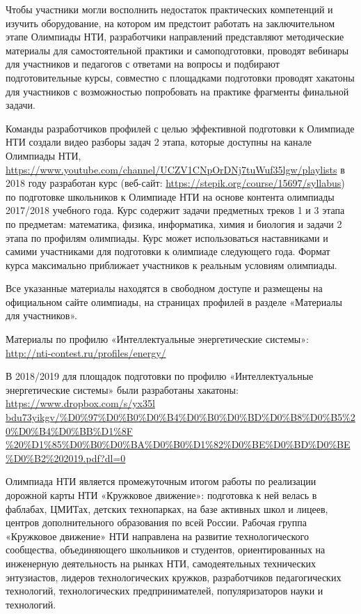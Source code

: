 Чтобы участники могли восполнить недостаток практических компетенций и изучить оборудование, на котором им предстоит работать на заключительном этапе Олимпиады НТИ, разработчики направлений представляют методические материалы для самостоятельной практики и самоподготовки, проводят вебинары для участников и педагогов с ответами на вопросы и подбирают подготовительные курсы, совместно с площадками подготовки проводят хакатоны для участников с возможностью попробовать на практике фрагменты финальной задачи. 

Команды разработчиков профилей с целью эффективной подготовки к Олимпиаде НТИ создали видео разборы задач 2 этапа, которые доступны на канале Олимпиады НТИ, \url{https://www.youtube.com/channel/UCZV1CNpOrDNj7tuWuf35lgw/playlists} в 2018 году разработан курс (веб-сайт: \url{https://stepik.org/course/15697/syllabus}) по подготовке школьников к Олимпиаде НТИ на основе контента олимпиады 2017/2018 учебного года. Курс содержит задачи предметных треков 1 и 3 этапа по предметам: математика, физика, информатика, химия и биология и задачи 2 этапа по профилям олимпиады. Курс может использоваться наставниками и самими участниками для подготовки к олимпиаде следующего года. Формат курса максимально приближает участников к реальным условиям олимпиады.

Все указанные материалы находятся в свободном доступе и размещены на официальном сайте олимпиады, на страницах профилей в разделе «Материалы для участников». 

Материалы по профилю «Интеллектуальные энергетические системы»: \url{http://nti-contest.ru/profiles/energy/}

В 2018/2019 для площадок подготовки по профилю «Интеллектуальные энергетические системы» были разработаны хакатоны: \url{https://www.dropbox.com/s/yx35l}\\\url{bdu73yikgv/%D0%97%D0%B0%D0%B4%D0%B0%D0%BD%D0%B8%D0%B5%20%D0%B4%D0%BB%D1%8F}\\\url{%20%D1%85%D0%B0%D0%BA%D0%B0%D1%82%D0%BE%D0%BD%D0%BE%D0%B2%202019.pdf?dl=0}  

Олимпиада НТИ является промежуточным итогом работы по реализации дорожной карты НТИ «Кружковое движение»: подготовка к ней велась в фаблабах, ЦМИТах, детских технопарках, на базе активных школ и лицеев, центров дополнительного образования по всей России. Рабочая группа «Кружковое движение» НТИ направлена на развитие технологического сообщества, объединяющего школьников и студентов, ориентированных на инженерную деятельность на рынках НТИ, самодеятельных технических энтузиастов, лидеров технологических кружков, разработчиков педагогических технологий, технологических предпринимателей, популяризаторов науки и технологий.

